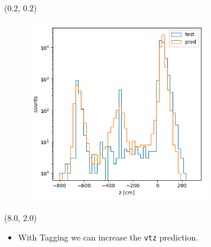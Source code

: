 \documentclass[12pt, xcolor={dvipsnames}, aspectratio = 169]{beamer}
\begin{document}
\begin{frame}[fragile]

\begin{textblock}{8.0}(0.2, 0.2)
    \begin{figure}
        \centering
        \includegraphics[width=8.0cm]{../imgs/cls-vtz.png}
    \end{figure}
\end{textblock}

\begin{textblock}{8.0}(8.0, 2.0)
    \begin{itemize}
        \item With Tagging we can increase the \verb|vtz| prediction.
    \end{itemize}
\end{textblock}

\end{frame}
\end{document}
